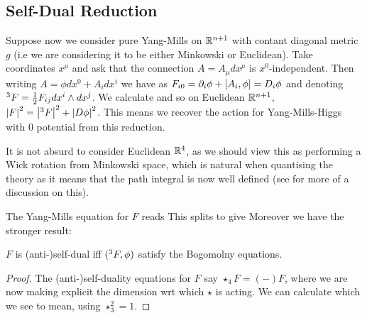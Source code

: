 \documentclass{article}
\begin{document}
\subsection{Self-Dual Reduction}\label{subsec: self dual reduction}
Suppose now we consider pure Yang-Mills on $\mathbb{R}^{n+1}$ with contant diagonal metric $g$ (i.e we are considering it to be either Minkowski or Euclidean). Take coordinates $x^\mu$ and ask that the connection $A = A_\mu dx^\mu$ is $x^0$-independent. Then writing $A = \phi dx^0 + A_i dx^i$ we have 
as $F_{i0} = \partial_i \phi + \left[ A_i, \phi \right] = D_i \phi$ and denoting $\indices{^3}F = \frac{1}{2}F_{ij} dx^i \wedge dx^j$. We calculate
and so on Euclidean $\mathbb{R}^{n+1}$, $\abs{F}^2 = \abs{\indices{^3}F}^2 + \abs{D\phi}^2 $. This means we recover the action for Yang-Mills-Higgs with $0$ potential from this reduction. 
\begin{remark}
	It is not absurd to consider Euclidean $\mathbb{R}^4$, as we should view this as performing a Wick rotation from Minkowski space, which is natural when quantising the theory as it means that the path integral is now well defined (see \cite{Ward1991} for more of a discussion on this). 
\end{remark}
The Yang-Mills equation for $F$ reads 
This splits to give 
Moreover we have the stronger result:
\begin{prop}
	$F$ is (anti-)self-dual iff $(\indices{^3}F,\phi)$ satisfy the Bogomolny equations. 
\end{prop}
\begin{proof}
	The (anti-)self-duality equations for $F$ say $\star_4 F = (-)F$, where we are now making explicit the dimension wrt which $\star$ is acting. We can calculate 
which we see to mean, using $\star_3^2=1$.  
\end{proof}
\end{document}
